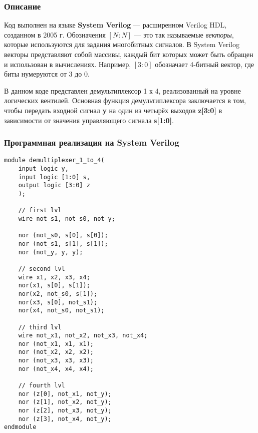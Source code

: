 \subsubsection{Описание}

Код выполнен на языке \textbf{System Verilog} — расширенном Verilog HDL, созданном в 2005 г. Обозначения $[N:N]$ — это так называемые \textit{векторы}, которые используются для задания многобитных сигналов. В System Verilog векторы представляют собой массивы, каждый бит которых может быть обращен и использован в вычислениях. Например, $[3:0]$ обозначает 4-битный вектор, где биты нумеруются от 3 до 0.

В данном коде представлен демультиплексор 1 к 4, реализованный на уровне логических вентилей. Основная функция демультиплексора заключается в том, чтобы передать входной сигнал \textbf{y} на один из четырёх выходов \textbf{z[3:0]} в зависимости от значения управляющего сигнала \textbf{s[1:0]}.

\subsubsection{Программная реализация на System Verilog}

\begin{lstlisting}
module demultiplexer_1_to_4(
    input logic y,
    input logic [1:0] s,
    output logic [3:0] z
    );

    // first lvl
    wire not_s1, not_s0, not_y;

    nor (not_s0, s[0], s[0]);
    nor (not_s1, s[1], s[1]);
    nor (not_y, y, y);
    
    // second lvl
    wire x1, x2, x3, x4;
    nor(x1, s[0], s[1]);
    nor(x2, not_s0, s[1]);
    nor(x3, s[0], not_s1);
    nor(x4, not_s0, not_s1);
    
    // third lvl
    wire not_x1, not_x2, not_x3, not_x4;
    nor (not_x1, x1, x1);
    nor (not_x2, x2, x2);
    nor (not_x3, x3, x3);
    nor (not_x4, x4, x4);
    
    // fourth lvl
    nor (z[0], not_x1, not_y);
    nor (z[1], not_x2, not_y);
    nor (z[2], not_x3, not_y);
    nor (z[3], not_x4, not_y);
endmodule
\end{lstlisting}
